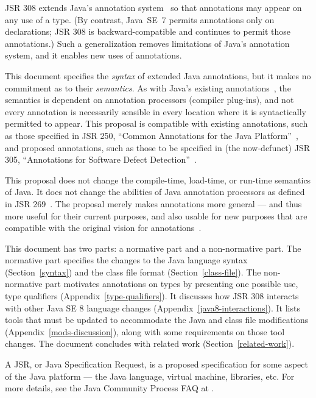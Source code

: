 \documentclass[10pt]{article}
\begin{document}
JSR 308 extends Java's annotation system~\cite{JSR175} so that
annotations may appear on any use of a type.
(By contrast, Java~SE~7 permits annotations only on
declarations; JSR 308 is
backward-compatible and continues to permit those annotations.)
Such a generalization removes
limitations of Java's annotation
system, and it enables new uses of annotations.

This document specifies the \emph{syntax} of extended Java annotations, but
it makes no commitment as to their \emph{semantics}.  As with Java's
existing annotations~\cite{JSR175}, the semantics is dependent on annotation processors
(compiler plug-ins), and not every annotation is necessarily sensible in
every location where it is syntactically permitted to appear.
This proposal is compatible with existing annotations,
such as those specified in JSR 250, ``Common Annotations for the Java
Platform''~\cite{JSR250}, and proposed annotations, such as those to be
specified in (the now-defunct) JSR 305, ``Annotations for Software Defect
Detection''~\cite{JSR305}.

This proposal does not change the compile-time, load-time, or run-time
semantics of Java.  It does not change the abilities of Java annotation
processors as defined in JSR 269~\cite{JSR269}.
The proposal merely makes annotations more general --- and thus more useful
for their current purposes, and also usable for new purposes that are
compatible with the original vision for annotations~\cite{JSR175}.

This document has two parts:  a 
normative part and a 
non-normative part.
The normative part specifies the changes to
the Java language syntax (Section~\ref{syntax}) and
the class file format (Section~\ref{class-file}).
%
The non-normative part
motivates annotations on types by presenting one
possible use, type qualifiers
(Appendix~\ref{type-qualifiers}).
It discusses how JSR 308 interacts with 
other Java SE 8 language changes
(Appendix~\ref{java8-interactions}).
It lists tools that
must be updated to accommodate the Java and class file
modifications (Appendix~\ref{mods-discussion}), along with some
requirements on those tool changes.
The document concludes with
related work (Section~\ref{related-work}).

A JSR, or Java Specification Request, is a proposed specification for some
aspect of the Java platform --- the Java language, virtual machine,
libraries, etc.  For more details, see the Java Community Process FAQ at
.
\end{document}
